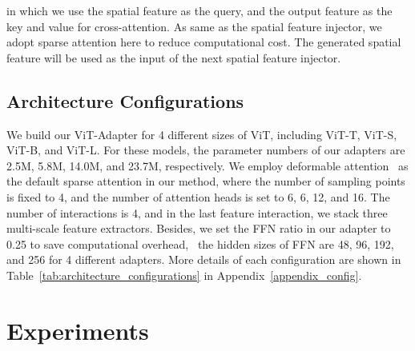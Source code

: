 \documentclass{article} \usepackage{iclr2023_conference,times}
\begin{document}
in which we use the spatial feature  as the query, and the output feature  as the key and value for cross-attention. 
As same as the spatial feature injector, we adopt sparse attention here to reduce computational cost.
The generated spatial feature  will be used as the input of the next spatial feature injector.





\vspace{-0.5em}
\subsection{Architecture Configurations}

We build our ViT-Adapter for 4 different sizes of ViT, including ViT-T, ViT-S, ViT-B, and ViT-L.
For these models, the parameter numbers of our adapters are 2.5M, 5.8M, 14.0M, and 23.7M, respectively.
We employ deformable attention~\citep{zhu2020deformable} as the default sparse attention in our method, where the number of sampling points is fixed to 4, and the number of attention heads is set to 6, 6, 12, and 16.
The number of interactions  is 4, and in the last feature interaction, we stack three multi-scale feature extractors.
Besides, we set the FFN ratio in our adapter to 0.25 to save computational overhead, \ie~the hidden sizes of FFN are 48, 96, 192, and 256 for 4 different adapters.
More details of each configuration are shown in Table~\ref{tab:architecture_configurations} in Appendix~\ref{appendix_config}. 

\vspace{-0.5em}
\section{Experiments}
\end{document}
